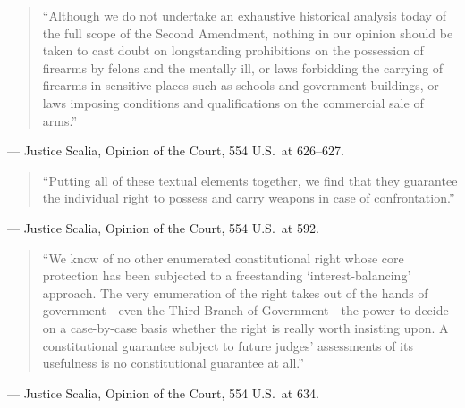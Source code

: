 \documentclass[12pt]{article}
\begin{document}
\begin{quote}
``Although we do not undertake an exhaustive historical analysis today of the full scope of the Second Amendment, nothing in our opinion should be taken to cast doubt on longstanding prohibitions on the possession of firearms by felons and the mentally ill, or laws forbidding the carrying of firearms in sensitive places such as schools and government buildings, or laws imposing conditions and qualifications on the commercial sale of arms.''
\end{quote}
\noindent --- Justice Scalia, Opinion of the Court, 554 U.S.\ at 626--627.

\begin{quote}
``Putting all of these textual elements together, we find that they guarantee the individual right to possess and carry weapons in case of confrontation.''
\end{quote}
\noindent --- Justice Scalia, Opinion of the Court, 554 U.S.\ at 592.

\begin{quote}
``We know of no other enumerated constitutional right whose core protection has been subjected to a freestanding `interest-balancing' approach. The very enumeration of the right takes out of the hands of government---even the Third Branch of Government---the power to decide on a case-by-case basis whether the right is really worth insisting upon. A constitutional guarantee subject to future judges' assessments of its usefulness is no constitutional guarantee at all.''
\end{quote}
\noindent --- Justice Scalia, Opinion of the Court, 554 U.S.\ at 634.
\end{document}
